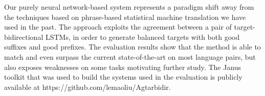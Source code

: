 Our purely neural network-based system represents a paradigm shift away from the techniques based on phrase-based statistical machine translation we have used in the past. The approach exploits the agreement between a pair of target-bidirectional LSTMs, in order to generate balanced targets with both good suffixes and good prefixes. The evaluation results show that the method is able to match and even surpass the current state-of-the-art on most language pairs, but also exposes weaknesses on some tasks motivating further study. The Janus toolkit that was used to build the systems used in the evaluation is publicly available at https://github.com/lemaoliu/Agtarbidir.
